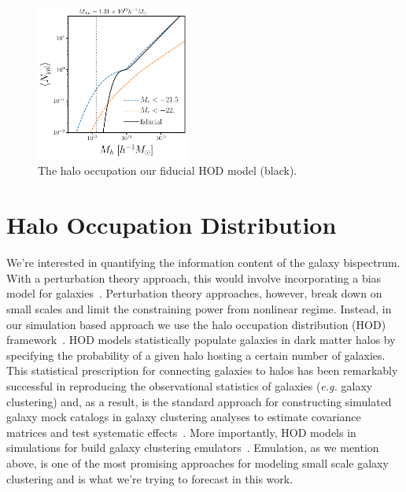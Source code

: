 \begin{figure}
\begin{center}
    \includegraphics[width=0.45\textwidth]{figs/hod_fid.pdf} 
    \caption{The halo occupation our fiducial HOD model (black).
    }\label{fig:hod}
\end{center}
\end{figure}

\section{Halo Occupation Distribution} \label{sec:hod}  
We're interested in quantifying the information content of the galaxy bispectrum. 
With a perturbation theory approach, this would involve incorporating a bias model 
for galaxies~\citep[\emph{e.g.}][]{sefusatti2006, yankelevich2019, chudaykin2019}.
Perturbation theory approaches, however, break down on small scales and limit
the constraining power from nonlinear regime. Instead, in our simulation based 
approach we use the halo occupation distribution (HOD) framework~\citep[\emph{e.g.}][]{zheng2005,leauthaud2012,tinker2013,zentner2016,vakili2019}.%
HOD models statistically populate galaxies in dark matter halos by specifying
the probability of a given halo hosting a certain number of galaxies. This 
statistical prescription for connecting galaxies to halos has been remarkably 
successful in reproducing the observational statistics of galaxies (\emph{e.g.} 
galaxy clustering) and, as a result, is the standard approach for constructing 
simulated galaxy mock catalogs in galaxy clustering analyses to estimate covariance 
matrices and test systematic effects~\citep[\emph{e.g.}][]{rodriguez-torres, mock challenge paper}. 
More importantly, HOD models in simulations for build galaxy clustering 
emulators~\citep[see the Aemulus project][]{zhai2018}. Emulation, as we mention above, 
is one of the most promising approaches for modeling small scale galaxy clustering 
and is what we're trying to forecast in this work. 

